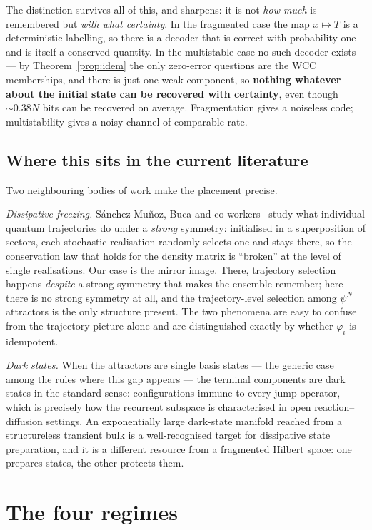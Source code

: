 \documentclass[11pt]{article}
\theoremstyle{plain}
\theoremstyle{definition}
\theoremstyle{remark}
\begin{document}
The distinction survives all of this, and sharpens: it is not \emph{how much}
is remembered but \emph{with what certainty}. In the fragmented case the map
$x \mapsto T$ is a deterministic labelling, so there is a decoder that is
correct with probability one and is itself a conserved quantity. In the
multistable case no such decoder exists --- by Theorem~\ref{prop:idem} the
only zero-error questions are the WCC memberships, and there is just one weak
component, so \textbf{nothing whatever about the initial state can be recovered
with certainty}, even though $\sim 0.38 N$ bits can be recovered on average.
Fragmentation gives a noiseless code; multistability gives a noisy channel of
comparable rate.

\subsection{Where this sits in the current literature}

Two neighbouring bodies of work make the placement precise.

\emph{Dissipative freezing.} S\'anchez Mu\~noz, Buca and
co-workers~\cite{freezing2019,freezing2023} study what individual quantum
trajectories do under a \emph{strong} symmetry: initialised in a superposition
of sectors, each stochastic realisation randomly selects one and stays there,
so the conservation law that holds for the density matrix is ``broken'' at the
level of single realisations. Our case is the mirror image. There, trajectory
selection happens \emph{despite} a strong symmetry that makes the ensemble
remember; here there is no strong symmetry at all, and the trajectory-level
selection among $\psi^N$ attractors is the only structure present. The two
phenomena are easy to confuse from the trajectory picture alone and are
distinguished exactly by whether $\varphi_i$ is idempotent.

\emph{Dark states.} When the attractors are single basis states --- the
generic case among the rules where this gap appears --- the terminal
components are dark states in the standard sense: configurations immune to
every jump operator, which is precisely how the recurrent subspace is
characterised in open reaction--diffusion settings. An exponentially large
dark-state manifold reached from a structureless transient bulk is a
well-recognised target for dissipative state preparation, and it is a
different resource from a fragmented Hilbert space: one prepares states, the
other protects them.

\section{The four regimes}
\label{sec:regimes}
\end{document}
